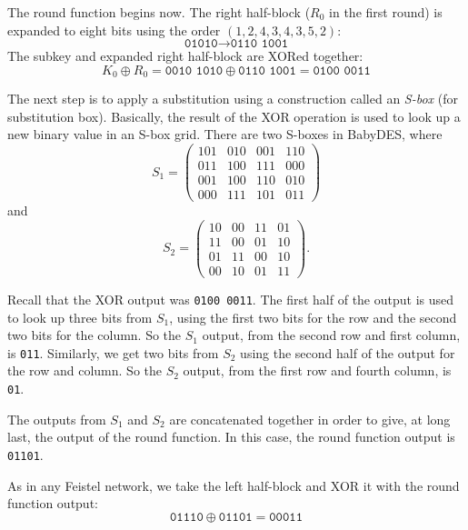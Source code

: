 \documentclass{book}
\theoremstyle{plain}
\theoremstyle{definition}
\newcommand{\ciphertext}[1]{\texttt{#1}} %
\begin{document}
The round function begins now. The right half-block ($R_0$ in the first round) is expanded to eight bits using the order $(1,2,4,3,4,3,5,2)$:
\begin{equation*}
\ciphertext{01010} \to \ciphertext{0110 1001}
\end{equation*}
The subkey and expanded right half-block are XORed together:
\begin{equation*}
K_0 \oplus R_0 = \ciphertext{0010 1010} \oplus \ciphertext{0110 1001} = \ciphertext{0100 0011}
\end{equation*}

The next step is to apply a substitution using a construction called an \textit{S-box} (for substitution box). Basically, the result of the XOR operation is used to look up a new binary value in an S-box grid. There are two S-boxes in BabyDES, where
\begin{equation*}
S_1 = \begin{pmatrix}
101 & 010 & 001 & 110 \\
011 & 100 & 111 & 000 \\
001 & 100 & 110 & 010 \\
000 & 111 & 101 & 011
\end{pmatrix}
\end{equation*}
and
\begin{equation*}
S_2 = \begin{pmatrix}
10 & 00 & 11 & 01 \\
11 & 00 & 01 & 10 \\
01 & 11 & 00 & 10 \\
00 & 10 & 01 & 11
\end{pmatrix}.
\end{equation*}

Recall that the XOR output was \ciphertext{0100 0011}. The first half of the output is used to look up three bits from $S_1$, using the first two bits for the row and the second two bits for the column. So the $S_1$ output, from the second row and first column, is \ciphertext{011}. Similarly, we get two bits from $S_2$ using the second half of the output for the row and column. So the $S_2$ output, from the first row and fourth column, is \ciphertext{01}.

The outputs from $S_1$ and $S_2$ are concatenated together in order to give, at long last, the output of the round function. In this case, the round function output is \ciphertext{01101}.

As in any Feistel network, we take the left half-block and XOR it with the round function output:
\begin{equation*}
\ciphertext{01110} \oplus \ciphertext{01101} = \ciphertext{00011}
\end{equation*}
\end{document}
